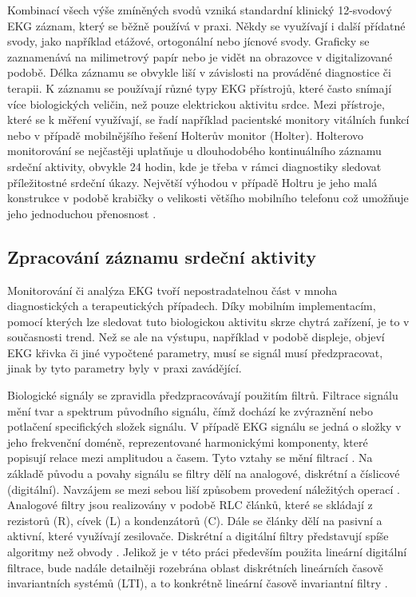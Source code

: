 Kombinací všech výše zmíněných svodů vzniká standardní klinický 12-svodový EKG
záznam, který se běžně používá v praxi. Někdy se využívají i další přídatné
svody, jako například etážové, ortogonální nebo jícnové svody. Graficky se
zaznamenává na milimetrový papír nebo je vidět na obrazovce v digitalizované
podobě. Délka záznamu se obvykle liší v závislosti na prováděné diagnostice či
terapii. K záznamu se používají různé typy EKG přístrojů, které často snímají
více biologických veličin, než pouze elektrickou aktivitu srdce. Mezi přístroje,
které se k měření využívají, se řadí například pacientské monitory vitálních
funkcí nebo v případě mobilnějšího řešení Holterův monitor (Holter). Holterovo
monitorování se nejčastěji uplatňuje u dlouhodobého kontinuálního záznamu
srdeční aktivity, obvykle 24 hodin, kde je třeba v rámci diagnostiky sledovat
příležitostné srdeční úkazy. Největší výhodou v případě Holtru je jeho malá
konstrukce v podobě krabičky o velikosti většího mobilního telefonu což umožňuje
jeho jednoduchou přenosnost \cite{Surawicz2008}.

\subsection{Zpracování záznamu srdeční aktivity}
\label{section:ecg_processing_theory}
Monitorování či analýza EKG tvoří nepostradatelnou část v mnoha diagnostických a
terapeutických případech. Díky mobilním implementacím, pomocí kterých lze
sledovat tuto biologickou aktivitu skrze chytrá zařízení, je to v současnosti
trend. Než se ale na výstupu, například v podobě displeje, objeví EKG křivka či
jiné vypočtené parametry, musí se signál musí předzpracovat, jinak by tyto
parametry byly v praxi zavádějící.

Biologické signály se zpravidla předzpracovávají použitím filtrů. Filtrace
signálu mění tvar a spektrum původního signálu, čímž dochází ke zvýraznění nebo
potlačení specifických složek signálu. V případě EKG signálu se jedná o složky
v jeho frekvenční doméně, reprezentované harmonickými komponenty, které popisují
relace mezi amplitudou a časem. Tyto vztahy se mění filtrací \cite{Jan2002}. Na
základě původu a povahy signálu se filtry dělí na analogové, diskrétní a
číslicové (digitální). Navzájem se mezi sebou liší způsobem provedení náležitých
operací \cite{Skop1994}. Analogové filtry jsou realizovány v podobě RLC článků,
které se skládají z rezistorů (R), cívek (L) a kondenzátorů (C). Dále se články
dělí na pasivní a aktivní, které využívají zesilovače. Diskrétní a digitální
filtry představují spíše algoritmy než obvody \cite{Prchal2000}. Jelikož je v
této práci především použita lineární digitální filtrace, bude nadále detailněji
rozebrána oblast diskrétních lineárních časově invariantních systémů (LTI), a to
konkrétně lineární časově invariantní filtry \cite{Jan2002}.

